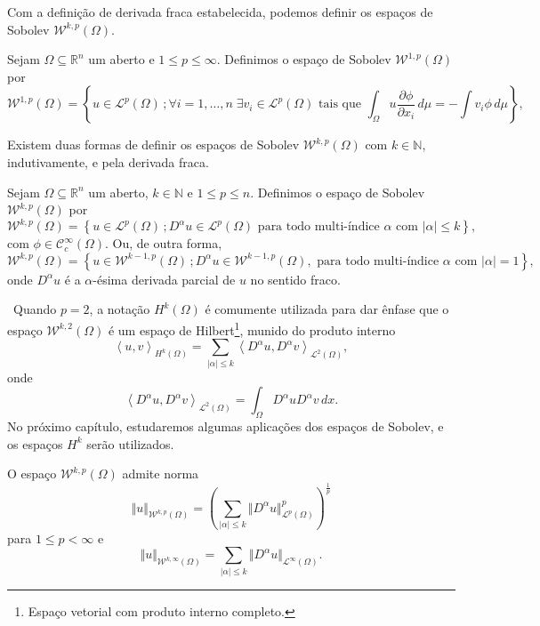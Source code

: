 \documentclass[a4paper, 11pt]{book}
\theoremstyle{definition}
\newcommand{\obs}{\noindent{\textbf{\textcolor{black}{\sffamily Observação:}}}~}
\newcommand{\bN}{\mathbb{N}}
\newcommand{\bR}{\mathbb{R}}
\newcommand{\cC}{\mathcal{C}}
\newcommand{\cL}{\mathcal{L}}
\newcommand{\cW}{\mathcal{W}}
\newcommand{\esssup}{\mathrm{ess\,sup}\,}
\begin{document}
Com a definição de derivada fraca estabelecida, podemos definir os espaços de Sobolev $\cW^{k,p}(\Omega)$.

\begin{dbox}
    Sejam $\Omega \subseteq \bR^n$ um aberto e $1 \leqslant p \leqslant \infty$. 
    Definimos o espaço de Sobolev $\cW^{1,p}(\Omega)$ por
    \[
        \cW^{1,p}(\Omega) = \left\{u \in \cL^p(\Omega) \,; \forall i = 1,\dots,n \;\exists v_i \in \cL^p(\Omega) \text{ tais que } \int_\Omega u \dfrac{\partial \phi}{\partial x_i} \, d\mu = -\!\!\int v_i \phi \,d\mu \right\},
    \]
\end{dbox}

Existem duas formas de definir os espaços de Sobolev $\cW^{k,p}(\Omega)$ com $k \in \bN$, indutivamente, e pela derivada fraca.

\begin{dbox}
    Sejam $\Omega \subseteq \bR ^n$ um aberto, $k \in \bN$ e $1 \leqslant p \leqslant n$. Definimos o espaço de Sobolev $\cW^{k,p}(\Omega)$ por
    \[
        \cW^{k,p}(\Omega) = \left\{ u \in \cL^p(\Omega) \,; D^\alpha u \in \cL^p(\Omega) \text{ para todo multi-índice } \alpha \text{ com } |\alpha| \leqslant k\right\},
    \]
    com $\phi \in \cC^\infty_c(\Omega)$. 
    Ou, de outra forma,
    \[
        \cW^{k,p}(\Omega) = \left\{ u \in \cW^{k-1,p}(\Omega) \,; D^\alpha u \in \cW^{k-1,p}(\Omega) , \text{ para todo multi-índice } \alpha \text{ com } |\alpha| = 1\right\},
    \]
    onde $D^\alpha u$ é a $\alpha$-ésima derivada parcial de $u$ no sentido fraco.
\end{dbox}

\obs Quando $p = 2$, a notação $H^{k}(\Omega)$ é comumente utilizada para dar ênfase que o espaço $\cW^{k,2}(\Omega)$ é um espaço de Hilbert\footnote{Espaço vetorial com produto interno completo.}, munido do produto interno
\[
    \left\langle u, v\right\rangle _{H^k(\Omega)} = \sum_{|\alpha| \leqslant k} \left\langle D^\alpha u, D^\alpha v\right\rangle _{\cL^2(\Omega)},
\]
onde
\[
    \left\langle D^\alpha u, D^\alpha v\right\rangle _{\cL^2(\Omega)} = \int_\Omega D^\alpha u D^\alpha v \,dx.
\]
No próximo capítulo, estudaremos algumas aplicações dos espaços de Sobolev, e os espaços $H^k$ serão utilizados.

\begin{dbox}
    O espaço $\cW^{k,p}(\Omega)$ admite norma
    \[
        \Vert u \Vert_{\cW^{k,p}(\Omega)} = \left( \sum_{|\alpha| \leqslant k} \Vert D^\alpha u \Vert_{\cL^p(\Omega)}^p \right)^{\frac{1}{p}}
    \]
    para $1 \leqslant p < \infty$ e 
    \[
        \Vert u \Vert_{\cW^{k,\infty}(\Omega)} 
        = \sum_{|\alpha| \leqslant k} \Vert D^{\alpha}u \Vert_{\cL^\infty(\Omega)}.
    \]
\end{dbox}
\end{document}
